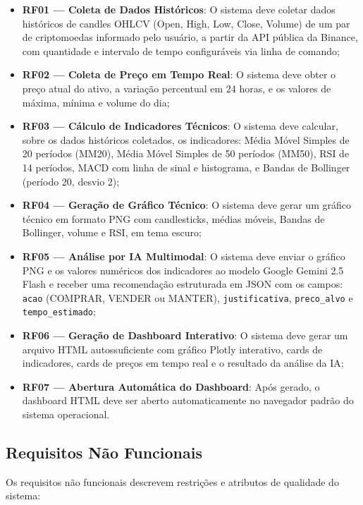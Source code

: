\documentclass[conference]{IEEEtran}
\begin{document}
\begin{itemize}
  \item \textbf{RF01 — Coleta de Dados Históricos}: O sistema deve coletar dados históricos de candles OHLCV (Open, High, Low, Close, Volume) de um par de criptomoedas informado pelo usuário, a partir da API pública da Binance, com quantidade e intervalo de tempo configuráveis via linha de comando;
  \item \textbf{RF02 — Coleta de Preço em Tempo Real}: O sistema deve obter o preço atual do ativo, a variação percentual em 24 horas, e os valores de máxima, mínima e volume do dia;
  \item \textbf{RF03 — Cálculo de Indicadores Técnicos}: O sistema deve calcular, sobre os dados históricos coletados, os indicadores: Média Móvel Simples de 20 períodos (MM20), Média Móvel Simples de 50 períodos (MM50), RSI de 14 períodos, MACD com linha de sinal e histograma, e Bandas de Bollinger (período 20, desvio 2);
  \item \textbf{RF04 — Geração de Gráfico Técnico}: O sistema deve gerar um gráfico técnico em formato PNG com candlesticks, médias móveis, Bandas de Bollinger, volume e RSI, em tema escuro;
  \item \textbf{RF05 — Análise por IA Multimodal}: O sistema deve enviar o gráfico PNG e os valores numéricos dos indicadores ao modelo Google Gemini 2.5 Flash e receber uma recomendação estruturada em JSON com os campos: \texttt{acao} (COMPRAR, VENDER ou MANTER), \texttt{justificativa}, \texttt{preco\_alvo} e \texttt{tempo\_estimado};
  \item \textbf{RF06 — Geração de Dashboard Interativo}: O sistema deve gerar um arquivo HTML autossuficiente com gráfico Plotly interativo, cards de indicadores, cards de preços em tempo real e o resultado da análise da IA;
  \item \textbf{RF07 — Abertura Automática do Dashboard}: Após gerado, o dashboard HTML deve ser aberto automaticamente no navegador padrão do sistema operacional.
\end{itemize}

\subsection{Requisitos Não Funcionais}

Os requisitos não funcionais descrevem restrições e atributos de qualidade do sistema:
\end{document}
